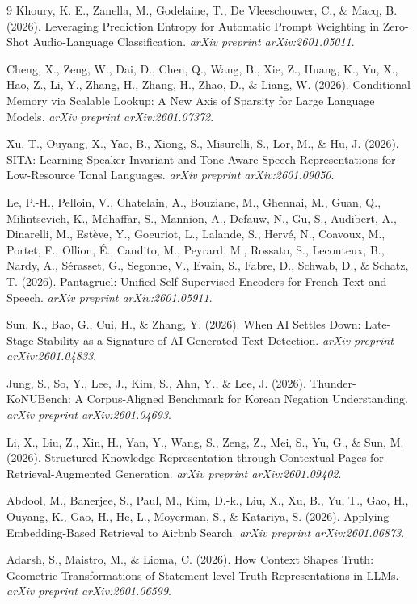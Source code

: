 \documentclass{article}
\begin{document}
\begin{thebibliography}{9}
 Khoury, K. E., Zanella, M., Godelaine, T., De Vleeschouwer, C., \& Macq, B. (2026). Leveraging Prediction Entropy for Automatic Prompt Weighting in Zero-Shot Audio-Language Classification. \emph{arXiv preprint arXiv:2601.05011}.

 Cheng, X., Zeng, W., Dai, D., Chen, Q., Wang, B., Xie, Z., Huang, K., Yu, X., Hao, Z., Li, Y., Zhang, H., Zhang, H., Zhao, D., \& Liang, W. (2026). Conditional Memory via Scalable Lookup: A New Axis of Sparsity for Large Language Models. \emph{arXiv preprint arXiv:2601.07372}.

 Xu, T., Ouyang, X., Yao, B., Xiong, S., Misurelli, S., Lor, M., \& Hu, J. (2026). SITA: Learning Speaker-Invariant and Tone-Aware Speech Representations for Low-Resource Tonal Languages. \emph{arXiv preprint arXiv:2601.09050}.

 Le, P.-H., Pelloin, V., Chatelain, A., Bouziane, M., Ghennai, M., Guan, Q., Milintsevich, K., Mdhaffar, S., Mannion, A., Defauw, N., Gu, S., Audibert, A., Dinarelli, M., Estève, Y., Goeuriot, L., Lalande, S., Hervé, N., Coavoux, M., Portet, F., Ollion, É., Candito, M., Peyrard, M., Rossato, S., Lecouteux, B., Nardy, A., Sérasset, G., Segonne, V., Evain, S., Fabre, D., Schwab, D., \& Schatz, T. (2026). Pantagruel: Unified Self-Supervised Encoders for French Text and Speech. \emph{arXiv preprint arXiv:2601.05911}.

 Sun, K., Bao, G., Cui, H., \& Zhang, Y. (2026). When AI Settles Down: Late-Stage Stability as a Signature of AI-Generated Text Detection. \emph{arXiv preprint arXiv:2601.04833}.

 Jung, S., So, Y., Lee, J., Kim, S., Ahn, Y., \& Lee, J. (2026). Thunder-KoNUBench: A Corpus-Aligned Benchmark for Korean Negation Understanding. \emph{arXiv preprint arXiv:2601.04693}.

 Li, X., Liu, Z., Xin, H., Yan, Y., Wang, S., Zeng, Z., Mei, S., Yu, G., \& Sun, M. (2026). Structured Knowledge Representation through Contextual Pages for Retrieval-Augmented Generation. \emph{arXiv preprint arXiv:2601.09402}.

 Abdool, M., Banerjee, S., Paul, M., Kim, D.-k., Liu, X., Xu, B., Yu, T., Gao, H., Ouyang, K., Gao, H., He, L., Moyerman, S., \& Katariya, S. (2026). Applying Embedding-Based Retrieval to Airbnb Search. \emph{arXiv preprint arXiv:2601.06873}.

 Adarsh, S., Maistro, M., \& Lioma, C. (2026). How Context Shapes Truth: Geometric Transformations of Statement-level Truth Representations in LLMs. \emph{arXiv preprint arXiv:2601.06599}.

\end{thebibliography}
\end{document}
